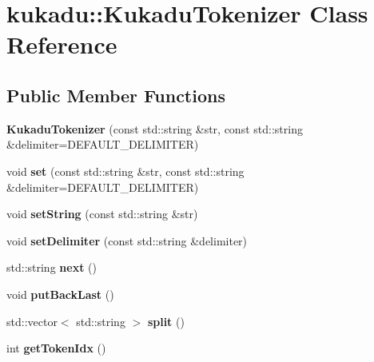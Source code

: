 \hypertarget{classkukadu_1_1KukaduTokenizer}{\section{kukadu\-:\-:Kukadu\-Tokenizer Class Reference}
\label{classkukadu_1_1KukaduTokenizer}
}
\subsection*{Public Member Functions}
\begin{DoxyCompactItemize}
\item 
\hypertarget{classkukadu_1_1KukaduTokenizer_aae8ae3c9b1fa4cf3b2e1d7aacce89042}{{\bfseries Kukadu\-Tokenizer} (const std\-::string \&str, const std\-::string \&delimiter=D\-E\-F\-A\-U\-L\-T\-\_\-\-D\-E\-L\-I\-M\-I\-T\-E\-R)}\label{classkukadu_1_1KukaduTokenizer_aae8ae3c9b1fa4cf3b2e1d7aacce89042}

\item 
\hypertarget{classkukadu_1_1KukaduTokenizer_a0bf607b688bdb8a21371335ac4415a1e}{void {\bfseries set} (const std\-::string \&str, const std\-::string \&delimiter=D\-E\-F\-A\-U\-L\-T\-\_\-\-D\-E\-L\-I\-M\-I\-T\-E\-R)}\label{classkukadu_1_1KukaduTokenizer_a0bf607b688bdb8a21371335ac4415a1e}

\item 
\hypertarget{classkukadu_1_1KukaduTokenizer_a0d3d6891c51dff67d9b9b367f9ffc930}{void {\bfseries set\-String} (const std\-::string \&str)}\label{classkukadu_1_1KukaduTokenizer_a0d3d6891c51dff67d9b9b367f9ffc930}

\item 
\hypertarget{classkukadu_1_1KukaduTokenizer_a6ca4375a16e6be13c2b425345c324811}{void {\bfseries set\-Delimiter} (const std\-::string \&delimiter)}\label{classkukadu_1_1KukaduTokenizer_a6ca4375a16e6be13c2b425345c324811}

\item 
\hypertarget{classkukadu_1_1KukaduTokenizer_a1276cdd662e68254f9f7f277e534603d}{std\-::string {\bfseries next} ()}\label{classkukadu_1_1KukaduTokenizer_a1276cdd662e68254f9f7f277e534603d}

\item 
\hypertarget{classkukadu_1_1KukaduTokenizer_ac432b19d37cd0ee3baf73d7ee350cf55}{void {\bfseries put\-Back\-Last} ()}\label{classkukadu_1_1KukaduTokenizer_ac432b19d37cd0ee3baf73d7ee350cf55}

\item 
\hypertarget{classkukadu_1_1KukaduTokenizer_a8fa96ce320c74d7b350546c28bc18d12}{std\-::vector$<$ std\-::string $>$ {\bfseries split} ()}\label{classkukadu_1_1KukaduTokenizer_a8fa96ce320c74d7b350546c28bc18d12}

\item 
\hypertarget{classkukadu_1_1KukaduTokenizer_a4d9ef340611b923b365394ee314f05b3}{int {\bfseries get\-Token\-Idx} ()}\label{classkukadu_1_1KukaduTokenizer_a4d9ef340611b923b365394ee314f05b3}

\end{DoxyCompactItemize}


